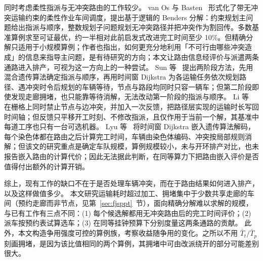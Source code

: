 \documentclass[manuscript,screen,review]{acmart}
\begin{document}
同时考虑柔性指派与无冲突路由的工作较少。
van Os 与 Basten~\cite{vanos2026exact} 形式化了带无冲突运输约束的柔性作业车间调度，提出基于逻辑的 Benders 分解：约束规划主问题给出指派与顺序，整数规划子问题规划无冲突路径并把冲突作为割回传。多数基准算例求至可证最优，约一半相对此前启发式改进完工时间至少 10\%。但精确分解只适用于小规模算例；作者也指出，如何更充分地利用「不可行由哪些冲突造成」的信息来指导主问题，是有待研究的方向；本文让路由信息经评价与派遣两条通路进入排产，可视为这一方向上的一种尝试。
Sun 等~\cite{sun2023integrated} 提出两阶段方法，先用混合遗传算法确定指派与顺序，再用时间窗 Dijkstra 为各运输任务依次规划路径、遇冲突时令后规划的车辆等待，节点与路段均同时只容一辆车；但第二阶段即使发现走廊拥堵，也只能靠等待消解，无法改动第一阶段的指派与顺序。
Li 等~\cite{li2026framework} 在栅格上同时禁止节点与边冲突，并加入一次反馈，把路径层实现的运输时长写回时间轴；但反馈只平移开工时刻、不修改指派，且仅作用于当前一个解，其基准中每道工序也只有一台可选机器。
Lyu 等~\cite{lyu2019approach} 将时间窗 Dijkstra 嵌入遗传算法解码，每个染色体都在路由之后计算完工时间，车辆由染色体编码、冲突按局部规则消解；但该文的研究重点是确定车队规模，算例规模较小，未与开环排产对比，也未报告嵌入路由的计算代价；因此无法据此判断，在同等算力下把路由嵌入评价是否值得付出额外的计算开销。

综上，现有工作的缺口不在于是否处理车辆冲突，而在于路由结果如何进入排产，以及这样做值多少。
本文研究运输耗时超过加工、拥堵集中于少数共享走廊的车间（预约走廊而非节点，见第~\ref{sec:fjsppt}~节），面向精确分解难以求解的规模，与已有工作有三点不同：(1) 每个候选解都用无冲突路由后的完工时间评价；(2) 派车按预约表试算选车；(3) 在同等挂钟预算下分别度量这两条通路的贡献。
此外，本文构造争用强度可控的算例族，考察收益随争用的变化。之所以不用 $\bar{T}_t/\bar{T}_p$ 刻画拥堵，是因为该比值相同的两个算例，其拥堵中可由改派绕开的部分可能差别很大。
\end{document}
